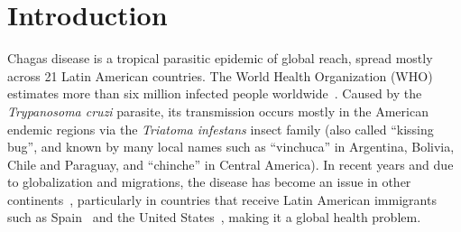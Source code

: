 
\chapter{Introduction}\label{ch:introduction}


Chagas disease is a tropical parasitic epidemic of global reach, spread mostly across 21 Latin American countries. The World Health Organization (WHO) estimates more than six million infected people worldwide~\cite{who2016}. Caused by the \textit{Trypanosoma cruzi} parasite, its transmission occurs mostly in the American endemic regions via the \textit{Triatoma infestans} insect family (also called ``kissing bug'', and known by many local names such as ``vinchuca'' in Argentina, Bolivia, Chile and Paraguay, and ``chinche'' in Central America). In recent years and due to globalization and migrations, the disease has become an %
issue in other continents~\cite{schmunis2010chagas},
particularly in countries that receive Latin American immigrants such as Spain~\cite{navarro2012chagas} and the United States~\cite{hotez2013unfolding},
making it a global health problem.


